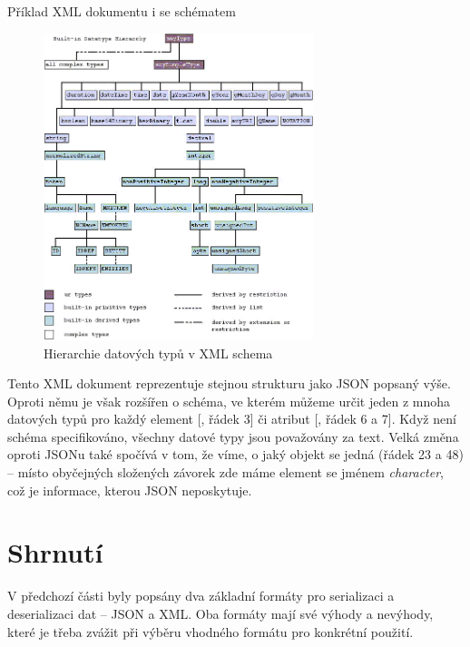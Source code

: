 \begin{listing}[ht!]
    \inputminted{xml}{resources/code/standards/player.xml}
    \caption{Příklad XML dokumentu i se schématem}
    \label{code:xml_player}
\end{listing}

\begin{figure}[ht!]
    \centering
    \includegraphics[width=0.7\textwidth]{figures/type-hierarchy.png}
    \caption{Hierarchie datových typů v XML schema \cite[]{w3XMLSchemaBuiltIn}}
    \label{fig:xml_datatypes}
\end{figure}

Tento XML dokument  reprezentuje stejnou strukturu jako JSON popsaný výše. Oproti němu je však rozšířen o schéma, ve kterém můžeme určit jeden z mnoha datových typů  pro každý element [, řádek 3] či atribut [, řádek 6 a 7]. Když není schéma specifikováno, všechny datové typy jsou považovány za text. Velká změna oproti JSONu také spočívá v tom, že víme, o jaký objekt se jedná (řádek 23 a 48) -- místo obyčejných složených závorek zde máme element se jménem \textit{character}, což je informace, kterou JSON neposkytuje.


\section{Shrnutí}\label{sec:formats:conclusion}
V předchozí části byly popsány dva základní formáty pro serializaci a deserializaci dat -- JSON a XML. Oba formáty mají své výhody a nevýhody, které je třeba zvážit při výběru vhodného formátu pro konkrétní použití.

